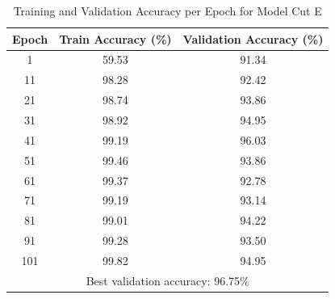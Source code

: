 \documentclass[11pt]{scrartcl}
\begin{document}
\begin{table}[htbp]
\centering
\caption{Training and Validation Accuracy per Epoch for Model Cut E}
\begin{tabular}{ccc}
\toprule
\textbf{Epoch} & \textbf{Train Accuracy (\%)} & \textbf{Validation Accuracy (\%)} \\
\midrule
1    & 59.53 & 91.34 \\
11   & 98.28 & 92.42 \\
21   & 98.74 & 93.86 \\
31   & 98.92 & 94.95 \\
41   & 99.19 & 96.03 \\
51   & 99.46 & 93.86 \\
61   & 99.37 & 92.78 \\
71   & 99.19 & 93.14 \\
81   & 99.01 & 94.22 \\
91   & 99.28 & 93.50 \\
101  & 99.82 & 94.95 \\
\midrule
\multicolumn{3}{c}{Best validation accuracy: 96.75\%} \\
\bottomrule
\end{tabular}
\label{tab:task3-bonus-cute-accuracy}
\end{table}
\end{document}

